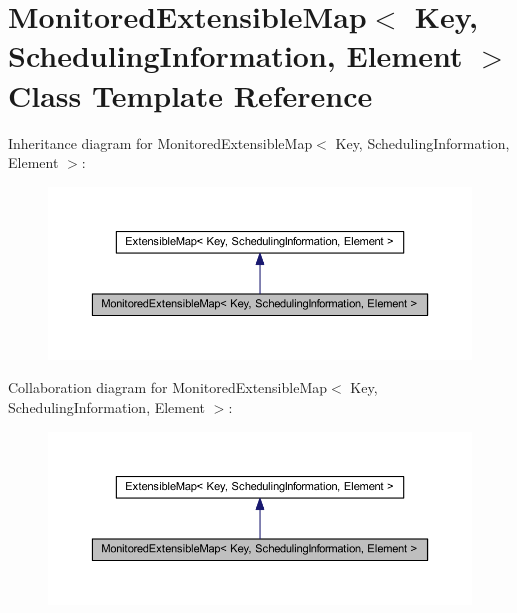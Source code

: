 \hypertarget{class_monitored_extensible_map}{
\section{MonitoredExtensibleMap$<$ Key, SchedulingInformation, Element $>$ Class Template Reference}
\label{class_monitored_extensible_map}
}


Inheritance diagram for MonitoredExtensibleMap$<$ Key, SchedulingInformation, Element $>$:\nopagebreak
\begin{figure}[H]
\begin{center}
\leavevmode
\includegraphics[width=382pt]{class_monitored_extensible_map__inherit__graph}
\end{center}
\end{figure}


Collaboration diagram for MonitoredExtensibleMap$<$ Key, SchedulingInformation, Element $>$:\nopagebreak
\begin{figure}[H]
\begin{center}
\leavevmode
\includegraphics[width=382pt]{class_monitored_extensible_map__coll__graph}
\end{center}
\end{figure}
